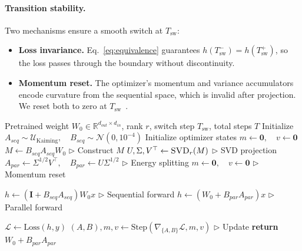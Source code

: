 \documentclass{article}
\newcommand{\Wbase}{W_0}
\newcommand{\Tswitch}{T_{\mathrm{sw}}}
\newcommand{\jelly}{\textsc{Jelly}}
\begin{document}
\paragraph{Transition stability.}
Two mechanisms ensure a smooth switch at $\Tswitch$:
\begin{itemize}
    \item \textbf{Loss invariance.} Eq.~\ref{eq:equivalence} guarantees $h(\Tswitch^-) = h(\Tswitch^+)$, so the loss passes through the boundary without discontinuity.
    \item \textbf{Momentum reset.} The optimizer's momentum and variance accumulators encode curvature from the sequential space, which is invalid after projection. We reset both to zero at $\Tswitch$~\citep{loshchilov2019adamw}.
\end{itemize}

\begin{algorithm}[t]
\caption{\jelly{}: Time-Axis Generalized Training via Task-Isomorphic Projection}
\label{alg:portal}
\begin{algorithmic}[1]
\REQUIRE Pretrained weight $\Wbase \in \mathbb{R}^{d_{out} \times d_{in}}$, rank $r$, switch step $\Tswitch$, total steps $T$
\STATE Initialize $A_{seq} \sim \mathcal{U}_{\text{Kaiming}}, \quad B_{seq} \sim \mathcal{N}(0, 10^{-4})$
\STATE Initialize optimizer states $m \gets \mathbf{0}, \quad v \gets \mathbf{0}$
    \IF{$t = \Tswitch$}
        \STATE $M \gets B_{seq} A_{seq} \Wbase$ \hfill $\triangleright$ Construct $M$
        \STATE $U, \Sigma, V^\top \gets \textsc{SVD}_r(M)$ \hfill $\triangleright$ SVD projection
        \STATE $A_{par} \gets \Sigma^{1/2} V^\top, \quad B_{par} \gets U\Sigma^{1/2}$ \hfill $\triangleright$ Energy splitting
        \STATE $m \gets \mathbf{0}, \quad v \gets \mathbf{0}$ \hfill $\triangleright$ Momentum reset
    \ENDIF
    
    \IF{$t < \Tswitch$}
        \STATE $h \gets (\mathbf{I} + B_{seq} A_{seq}) \Wbase x$ \hfill $\triangleright$ Sequential forward
    \ELSE
        \STATE $h \gets (\Wbase + B_{par} A_{par}) x$ \hfill $\triangleright$ Parallel forward
    \ENDIF
    
    \STATE $\mathcal{L} \gets \text{Loss}(h, y)$
    \STATE $(A, B), m, v \gets \text{Step}(\nabla_{\{A,B\}} \mathcal{L}, m, v)$ \hfill $\triangleright$ Update 
\ENDFOR
\STATE \textbf{return} $\Wbase + B_{par} A_{par}$ \hfill
\end{algorithmic}
\end{algorithm}
\end{document}
